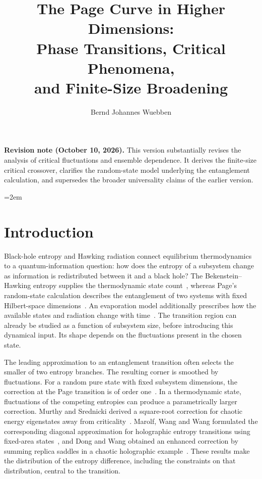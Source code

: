 \documentclass[11pt,letterpaper]{article}
\title{The Page Curve in Higher Dimensions:\\
Phase Transitions, Critical Phenomena,\\
and Finite-Size Broadening}
\author{Bernd Johannes Wuebben}
\affiliation{New York, NY, USA}
\theoremstyle{plain}
\theoremstyle{definition}
\theoremstyle{remark}
\begin{document}
\hypersetup{pageanchor=false}
\notoc
\maketitle
\par\bigskip
{\small\noindent\textbf{Revision note (October 10, 2026).}
This version substantially revises the analysis of critical fluctuations and ensemble dependence. It derives the finite-size critical crossover, clarifies the random-state model underlying the entanglement calculation, and supersedes the broader universality claims of the earlier version.\par}
\clearpage
{}
\hypersetup{pageanchor=true}
\newpage
\tableofcontents
\newpage
{}
\emergencystretch=2em

\section{Introduction}
\label{sec01:introduction}

Black-hole entropy and Hawking radiation connect equilibrium thermodynamics to a quantum-information question: how does the entropy of a subsystem change as information is redistributed between it and a black hole? The Bekenstein--Hawking entropy supplies the thermodynamic state count~\cite{bekenstein1973,hawking1975}, whereas Page's random-state calculation describes the entanglement of two systems with fixed Hilbert-space dimensions~\cite{page1993}. An evaporation model additionally prescribes how the available states and radiation change with time~\cite{page2013}. The transition region can already be studied as a function of subsystem size, before introducing this dynamical input. Its shape depends on the fluctuations present in the chosen state.

The leading approximation to an entanglement transition often selects the smaller of two entropy branches. The resulting corner is smoothed by fluctuations. For a random pure state with fixed subsystem dimensions, the correction at the Page transition is of order one~\cite{page1993}. In a thermodynamic state, fluctuations of the competing entropies can produce a parametrically larger correction. Murthy and Srednicki derived a square-root correction for chaotic energy eigenstates away from criticality~\cite{murthysrednicki2019}. Marolf, Wang and Wang formulated the corresponding diagonal approximation for holographic entropy transitions using fixed-area states~\cite{marolfwangwang2020}, and Dong and Wang obtained an enhanced correction by summing replica saddles in a chaotic holographic example~\cite{dongwang2020}. These results make the distribution of the entropy difference, including the constraints on that distribution, central to the transition.
\end{document}
